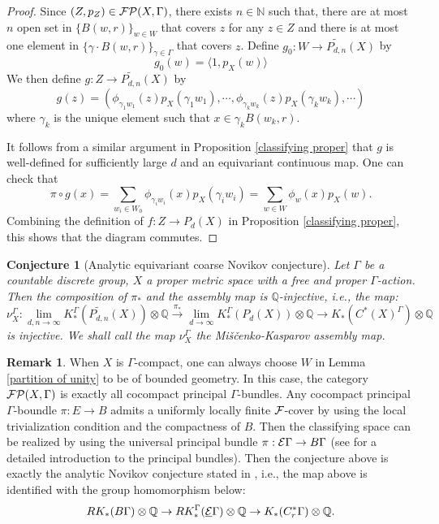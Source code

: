 \documentclass[11pt]{article}
\theoremstyle{definition}
\newtheorem{Rem}[Def]{Remark}
\theoremstyle{plain}
\newtheorem*{con}{Conjecture}
\def\IN{\mathbb N}\def\IR{\mathbb R}\def\IE{\mathbb E}\def\IC{\mathbb C}\def\IL{\mathbb L}\def\IQ{\mathbb Q}\def\IA{\mathbb A}\def\IZ{\mathbb Z}
\def\MRdnX{\widetilde{P_{d,n}}(X)}
\def\ox{\otimes}
\def\ox{\otimes}
\def\EG{\underline{\E}\Gamma}
\def\Ga{\Gamma}
\begin{document}
\begin{proof}
Since $(Z,p_Z)\in\F\P(X,\Ga)$, there exists $n\in\IN$ such that, there are at most $n$ open set in $\{B(w,r)\}_{w\in W}$ that covers $z$ for any $z\in Z$ and there is at most one element in $\{\gamma\cdot B(w,r)\}_{\gamma\in\Ga}$ that covers $z$. Define $g_0:W\to\MRdnX$ by
$$g_0(w)=\langle 1,p_X(w)\rangle$$
We then define $g:Z\to\MRdnX$ by
$$g(z)=\left(\phi_{\gamma_1w_1}(z)p_X(\gamma_1w_1),\cdots,\phi_{\gamma_kw_k}(z)p_X(\gamma_kw_k),\cdots\right)$$
where $\gamma_k$ is the unique element such that $x\in\gamma_kB(w_k,r)$.

It follows from a similar argument in Proposition \ref{classifying proper} that $g$ is well-defined for sufficiently large $d$ and an equivariant continuous map. One can check that
$$\pi\circ g(x)=\sum_{w_i\in W_0}\phi_{\gamma_iw_i}(x)p_X(\gamma_iw_i)=\sum_{w\in W}\phi_w(x)p_X(w).$$
Combining the definition of $f: Z\to P_d(X)$ in Proposition \ref{classifying proper}, this shows that the diagram commutes.
\end{proof}

\begin{con}[Analytic equivariant coarse Novikov conjecture]
Let $\Ga$ be a countable discrete group, $X$ a proper metric space with a free and proper $\Ga$-action. Then the composition of $\pi_*$ and the assembly map is $\IQ$-injective, i.e., the map:
$$\nu_{X}^{\Ga}:\lim_{d,n\to\infty}K^{\Ga}_*\left(\MRdnX\right)\ox\IQ\xrightarrow{\pi_*}\lim_{d\to\infty}K_*^{\Ga}(P_d(X))\ox\IQ\to K_*(C^*(X)^{\Ga})\ox\IQ$$
is injective. We shall call the map $\nu_X^{\Ga}$ the Miščenko-Kasparov assembly map.
\end{con}

\begin{Rem}
\label{rem:Milnor-Ripe-classifying}
When $X$ is $\Ga$-compact, one can always choose $W$ in Lemma \ref{partition of unity} to be of bounded geometry. In this case, the category $\F\P(X,\Ga)$ is exactly all cocompact principal $\Ga$-bundles. Any cocompact principal $\Ga$-boundle $\pi:E\to B$ admits a uniformly locally finite $\mathcal F$-cover by using the local trivialization condition and the compactness of $B$. Then the classifying space can be realized by using the universal principal bundle $\pi:\E\Ga\to B\Ga$ (see \cite{GTM20} for a detailed introduction to the principal bundles). Then the conjecture above is exactly the analytic Novikov conjecture stated in \cite{Roe1996}, i.e., the map above is identified with the group homomorphism below:
$$RK_*(B\Ga)\ox\IQ\to RK^{\Ga}_*(\EG)\ox\IQ\to K_*(C^*_r\Ga)\ox\IQ.$$
\end{Rem}
\end{document}
